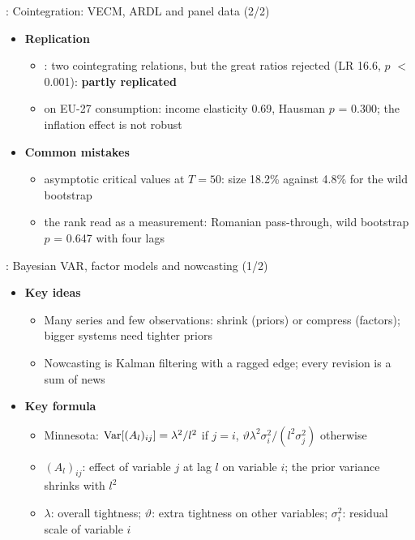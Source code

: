 \begin{frame}{: Cointegration: VECM, ARDL and panel data (2/2)}
\itemsize{\small}
\begin{itemize}
    \item \textbf{Replication}
    \begin{itemize}
        \item {}: two cointegrating relations, but the great ratios rejected (LR 16.6, $p$ $<$0.001): \textbf{partly replicated}
        \item {} on EU-27 consumption: income elasticity 0.69, Hausman $p$ = 0.300; the inflation effect is not robust
    \end{itemize}
    \item \textbf{Common mistakes}
    \begin{itemize}
        \item asymptotic critical values at $T = 50$: size 18.2\% against 4.8\% for the wild bootstrap
        \item the rank read as a measurement: Romanian pass-through, wild bootstrap $p$ = 0.647 with four lags
    \end{itemize}
\end{itemize}
\end{frame}

\begin{frame}{: Bayesian VAR, factor models and nowcasting (1/2)}
\itemsize{\footnotesize}
\begin{itemize}
    \item \textbf{Key ideas}
    \begin{itemize}
        \item Many series and few observations: shrink (priors) or compress (factors); bigger systems need tighter priors
        \item Nowcasting is Kalman filtering with a ragged edge; every revision is a sum of news
    \end{itemize}
    \item \textbf{Key formula}
    \begin{itemize}
        \item Minnesota: $\text{Var}[(A_l)_{ij}] = \lambda^2/l^2$ if $j = i$, $\vartheta\lambda^2\sigma_i^2/(l^2\sigma_j^2)$ otherwise
        \item $(A_l)_{ij}$: effect of variable $j$ at lag $l$ on variable $i$; the prior variance shrinks with $l^2$
        \item $\lambda$: overall tightness; $\vartheta$: extra tightness on other variables; $\sigma_i^2$: residual scale of variable $i$
    \end{itemize}
\end{itemize}
\end{frame}

